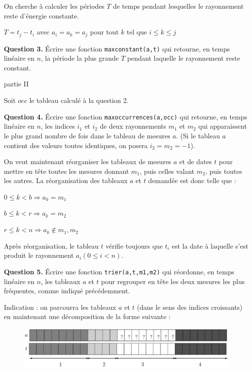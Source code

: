 \documentclass[11pt,a4paper]{article}
\begin{document}
On cherche à calculer les périodes $T$ de temps pendant lesquelles le rayonnement reste d’énergie constante.

$T = t_j - t_i$ avec $a_i = a_k = a_j$ pour tout $k$ tel que $i \le k \le j$

\bigskip

\textbf{Question 3.} Écrire une fonction \texttt{maxconstant(a,t)} qui retourne, en temps linéaire en $n$, la période la plus grande $T$ pendant laquelle le rayonnement reste constant.

\bigskip

\begin{center}
\huge{partie II}
\end{center}

\bigskip

Soit $occ$ le tableau calculé à la question 2.

\bigskip

\textbf{Question 4.} Écrire une fonction \texttt{maxoccurrences(a,occ)} qui retourne, en temps linéaire en $n$, les indices $i_1$ et $i_2$ de deux rayonnements $m_1$ et $m_2$ qui apparaissent le plus grand nombre de fois dans le tableau de mesures $a$.
(Si le tableau $a$ contient des valeurs toutes identiques, on posera $i_2=m_2 = -1$).

On veut maintenant réorganiser les tableaux de mesures $a$ et de dates $t$ pour mettre en tête toutes les mesures donnant $m_1$, puis celles valant $m_2$, puis toutes les autres.
La réorganisation des tableaux $a$ et $t$ demandée est donc telle que :

$0\le k<b \Rightarrow a_k=m_1$

$b\le k<r \Rightarrow a_k=m_2$

$r\le k<n \Rightarrow a_k \notin {m_1,m_2}$

Après réorganisation, le tableau $t$ vérifie toujours que $t_i$ est la date à laquelle s’est produit le rayonnement $a_i (0 \le i < n)$.

\bigskip

\textbf{Question 5.} Écrire une fonction \texttt{trier(a,t,m1,m2)} qui réordonne, en temps linéaire en $n$, les tableaux $a$ et $t$ pour regrouper en tête les deux mesures les plus fréquentes, comme indiqué précédemment.

Indication : on parcourra les tableaux $a$ et $t$ (dans le sens des indices croissants) en maintenant une décomposition de la forme suivante :

\begin{figure}[h]
\begin{center}
\includegraphics[scale=0.15]{Image1.jpg} 
\end{center}
\end{figure}
\end{document}
